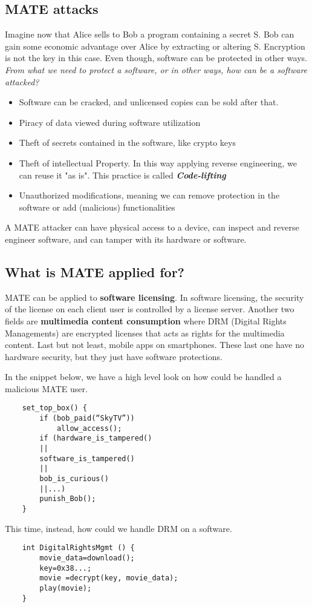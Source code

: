 \subsection{MATE attacks}

Imagine now that Alice sells to Bob a program containing a secret S.
Bob can gain some economic advantage over Alice by extracting or altering S. 
Encryption is not the key in this case. Even though, software can be protected in other ways. 
\newline
\textit{From what we need to protect a software, or in other ways, how can be a software attacked?}
\newline
\begin{itemize}
    \item Software can be cracked, and unlicensed copies can be sold after that.
    \item Piracy of data viewed during software utilization
    \item Theft of secrets contained in the software, like crypto keys
    \item Theft of intellectual Property. In this way applying reverse engineering, we can reuse it "as is". This practice is called \textbf{\textit{Code-lifting}}
    \item Unauthorized modifications, meaning we can remove protection in the software or add (malicious) functionalities
\end{itemize}

A MATE attacker can have physical access to a device, can inspect and reverse engineer software, and can tamper with its hardware or software. 

\subsection{What is MATE applied for?}

MATE can be applied to \textbf{software licensing}. In software licensing, the security of the license on each client user is controlled by a license server. Another two fields are \textbf{multimedia content consumption} where DRM (Digital Rights Managements) are encrypted licenses that acts as rights for the multimedia content. Last but not least, mobile apps on smartphones. These last one have no hardware security, but they just have software protections. 
\par
In the snippet below, we have a high level look on how could be handled a malicious MATE user.
\begin{lstlisting}
    set_top_box() {
        if (bob_paid(“SkyTV”))
            allow_access();
        if (hardware_is_tampered()
        ||
        software_is_tampered()
        ||
        bob_is_curious()
        ||...)
        punish_Bob();
    }
\end{lstlisting}
This time, instead, how could we handle DRM on a software.
\begin{lstlisting}
    int DigitalRightsMgmt () {
        movie_data=download();
        key=0x38...;
        movie =decrypt(key, movie_data);
        play(movie);
    }
\end{lstlisting}

